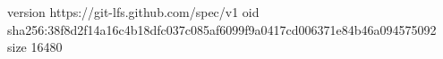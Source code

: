 version https://git-lfs.github.com/spec/v1
oid sha256:38f8d2f14a16c4b18dfc037c085af6099f9a0417cd006371e84b46a094575092
size 16480
